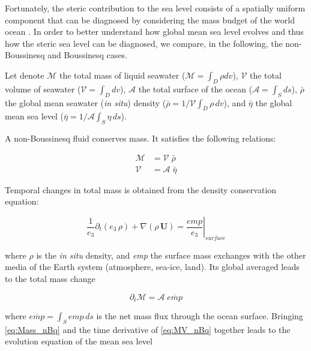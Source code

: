 \documentclass[../main/NEMO_manual]{subfiles}
\begin{document}
Fortunately, the steric contribution to the sea level consists of a spatially uniform component that
can be diagnosed by considering the mass budget of the world ocean \citep{Greatbatch_JGR94}.
In order to better understand how global mean sea level evolves and thus how the steric sea level can be diagnosed,
we compare, in the following, the non-Boussinesq and Boussinesq cases.

Let denote
$\mathcal{M}$ the total mass    of liquid seawater ($\mathcal{M} = \int_D \rho dv$), 
$\mathcal{V}$ the total volume  of        seawater      ($\mathcal{V} = \int_D dv$), 
$\mathcal{A}$ the total surface of       the ocean      ($\mathcal{A} = \int_S ds$), 
$\bar{\rho}$ the global mean  seawater (\textit{in situ}) density 
($\bar{\rho} = 1/\mathcal{V} \int_D \rho \,dv$), and
$\bar{\eta}$ the global mean sea level 
($\bar{\eta} = 1/\mathcal{A} \int_S \eta \,ds$).

A non-Boussinesq fluid conserves mass. It satisfies the following relations:

\begin{equation}
  \begin{split}
    \mathcal{M} &=  \mathcal{V}  \;\bar{\rho} \\
    \mathcal{V} &=  \mathcal{A}  \;\bar{\eta}
  \end{split}
  \label{eq:MV_nBq}
\end{equation}

Temporal changes in total mass is obtained from the density conservation equation:

\begin{equation}
  \frac{1}{e_3} \partial_t ( e_3\,\rho) + \nabla( \rho \, \textbf{U} )
  = \left. \frac{\textit{emp}}{e_3}\right|_\textit{surface}
  \label{eq:Co_nBq}
\end{equation}

where $\rho$ is the \textit{in situ} density, and \textit{emp} the surface mass exchanges with the other media of
the Earth system (atmosphere, sea-ice, land).
Its global averaged leads to the total mass change 

\begin{equation}
  \partial_t \mathcal{M} = \mathcal{A} \;\overline{\textit{emp}}
  \label{eq:Mass_nBq}
\end{equation}

where $\overline{\textit{emp}} = \int_S \textit{emp}\,ds$ is the net mass flux through the ocean surface.
Bringing \autoref{eq:Mass_nBq} and the time derivative of \autoref{eq:MV_nBq} together leads to
the evolution equation of the mean sea level
\end{document}
